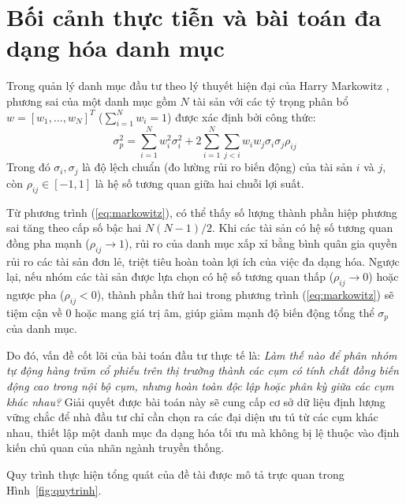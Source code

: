 \documentclass[12pt,a4paper,oneside,openany]{report}
\begin{document}
\section{Bối cảnh thực tiễn và bài toán đa dạng hóa danh mục}
Trong quản lý danh mục đầu tư theo lý thuyết hiện đại của Harry Markowitz \cite{markowitz1952}, phương sai của một danh mục gồm $N$ tài sản với các tỷ trọng phân bổ $w = [w_1, \dots, w_N]^T$ ($\sum_{i=1}^N w_i = 1$) được xác định bởi công thức:
\begin{equation}
  \sigma_p^2 = \sum_{i=1}^N w_i^2 \sigma_i^2 + 2 \sum_{i=1}^{N} \sum_{j < i} w_i w_j \sigma_i \sigma_j \rho_{ij}
  \label{eq:markowitz}
\end{equation}
Trong đó $\sigma_i, \sigma_j$ là độ lệch chuẩn (đo lường rủi ro biến động) của tài sản $i$ và $j$, còn $\rho_{ij} \in [-1, 1]$ là hệ số tương quan giữa hai chuỗi lợi suất.

Từ phương trình (\ref{eq:markowitz}), có thể thấy số lượng thành phần hiệp phương sai tăng theo cấp số bậc hai $N(N-1)/2$. Khi các tài sản có hệ số tương quan đồng pha mạnh ($\rho_{ij} \to 1$), rủi ro của danh mục xấp xỉ bằng bình quân gia quyền rủi ro các tài sản đơn lẻ, triệt tiêu hoàn toàn lợi ích của việc đa dạng hóa. Ngược lại, nếu nhóm các tài sản được lựa chọn có hệ số tương quan thấp ($\rho_{ij} \to 0$) hoặc ngược pha ($\rho_{ij} < 0$), thành phần thứ hai trong phương trình (\ref{eq:markowitz}) sẽ tiệm cận về 0 hoặc mang giá trị âm, giúp giảm mạnh độ biến động tổng thể $\sigma_p$ của danh mục.

Do đó, vấn đề cốt lõi của bài toán đầu tư thực tế là: \textit{Làm thế nào để phân nhóm tự động hàng trăm cổ phiếu trên thị trường thành các cụm có tính chất đồng biến động cao trong nội bộ cụm, nhưng hoàn toàn độc lập hoặc phân kỳ giữa các cụm khác nhau?} Giải quyết được bài toán này sẽ cung cấp cơ sở dữ liệu định lượng vững chắc để nhà đầu tư chỉ cần chọn ra các đại diện ưu tú từ các cụm khác nhau, thiết lập một danh mục đa dạng hóa tối ưu mà không bị lệ thuộc vào định kiến chủ quan của nhãn ngành truyền thống.

Quy trình thực hiện tổng quát của đề tài được mô tả trực quan trong Hình~\ref{fig:quytrinh}.
\end{document}

